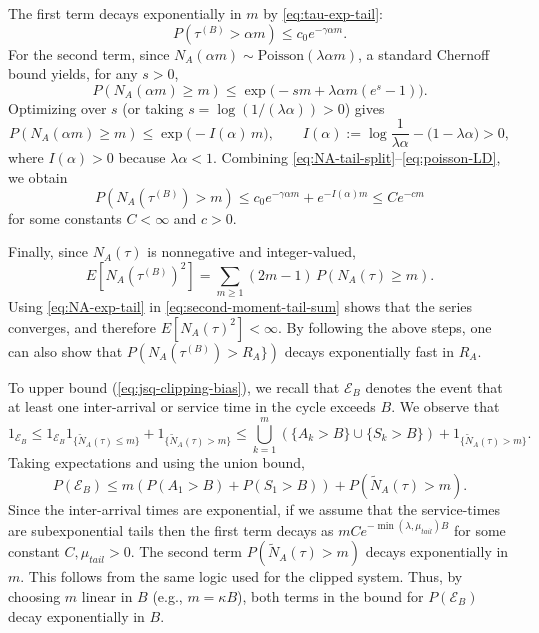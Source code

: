 \documentclass[11pt]{article}
\begin{document}
The first term decays exponentially in \(m\) by \eqref{eq:tau-exp-tail}:
\begin{equation}
\label{eq:term1}
P(\tau^{(B)}>\alpha m)\le c_0 e^{-\gamma \alpha m}.
\end{equation}
For the second term, since \(N_A(\alpha m)\sim \mathrm{Poisson}(\lambda\alpha m)\),
a standard Chernoff bound yields, for any \(s>0\),
\[
P(N_A(\alpha m)\ge m)
\le \exp\!\Big(-sm + \lambda\alpha m (e^s-1)\Big).
\]
Optimizing over \(s\) (or taking \(s=\log(1/(\lambda\alpha))>0\)) gives
\begin{equation}
\label{eq:poisson-LD}
P(N_A(\alpha m)\ge m)\le \exp\!\big(-I(\alpha)\,m\big),
\qquad
I(\alpha):=\log\frac{1}{\lambda\alpha}-\big(1-\lambda\alpha\big)>0,
\end{equation}
where \(I(\alpha)>0\) because \(\lambda\alpha<1\).
Combining \eqref{eq:NA-tail-split}--\eqref{eq:poisson-LD}, we obtain
\begin{equation}
\label{eq:NA-exp-tail}
P(N_A(\tau^{(B)})>m)\le c_0 e^{-\gamma\alpha m} + e^{-I(\alpha)m}
\le C e^{-c m}
\end{equation}
for some constants \(C<\infty\) and \(c>0\).

Finally, since \(N_A(\tau)\) is nonnegative and integer-valued,
\begin{equation}
\label{eq:second-moment-tail-sum}
E[N_A(\tau^{(B)})^2]=\sum_{m\ge 1}(2m-1)\,P(N_A(\tau)\ge m).
\end{equation}
Using \eqref{eq:NA-exp-tail} in \eqref{eq:second-moment-tail-sum} shows that the
series converges, and therefore \(E[N_A(\tau)^2]<\infty\). By following the above steps, one can also show that $P(N_A(\tau^{(B)})>R_A\})$ decays exponentially fast in $R_A.$ 

To upper bound (\ref{eq:jsq-clipping-bias}), we recall that $\mathcal{E}_B$ denotes the event that at least one inter-arrival or service time in the cycle exceeds $B$. We observe that
\begin{equation}
{1}_{\mathcal{E}_B} \le {1}_{\mathcal{E}_B}{1}_{\{\tilde{N}_A(\tau)\leq m\}} + {1}_{\{\tilde{N}_A(\tau)> m\}} \leq \bigcup_{k=1}^{m} \left( \{ A_k > B \} \cup \{ S_k > B \} \right) + {1}_{\{\tilde{N}_A(\tau)> m\}}.
\end{equation}
Taking expectations and using the union bound,
$$
P(\mathcal{E}_B) \leq m \left( P(A_1>B) + P(S_1>B) \right) + P(\tilde{N}_A(\tau)>m).
$$
Since the inter-arrival times are exponential, if we assume that the service-times are subexponential tails then the first term decays as $mC e^{-\min(\lambda, \mu_{tail}) B}$ for some constant $C, \mu_{tail}>0$.
The second term $P(\tilde{N}_A(\tau)>m)$ decays exponentially in $m$. This follows from the same logic used for the clipped system.
Thus, by choosing $m$ linear in $B$ (e.g., $m = \kappa B$), both terms in the bound for $P(\mathcal{E}_B)$ decay exponentially in $B$.
\newpage
{}
\end{document}
